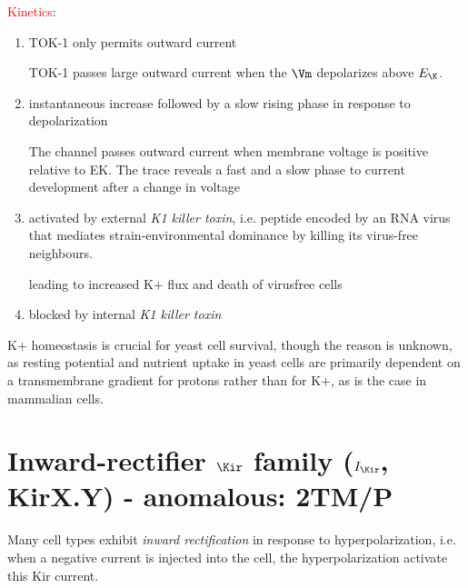 \textcolor{red}{Kinetics}:
\begin{enumerate}
  \item TOK-1  only permits outward current

TOK-1 passes large outward current when the $\Vm$ depolarizes above
$E_\K$.
  
  \item  instantaneous increase followed by a slow rising phase in response to
  depolarization 

The channel passes outward current when membrane voltage is positive relative to
EK. The trace reveals a fast and a slow phase to current development after a
change in voltage
 
  \item activated by external {\it K1 killer toxin}, i.e. peptide encoded by an
  RNA virus that mediates strain-environmental dominance by killing its
  virus-free neighbours.
  
  leading to increased K+ flux and death of virusfree cells

  \item blocked by internal {\it K1 killer toxin}  
\end{enumerate}

\begin{mdframed}

K+ homeostasis is crucial for yeast cell survival, though the reason is unknown, as resting potential and nutrient
uptake in yeast cells are primarily dependent on a transmembrane gradient for protons rather than for K+, as is 
the case in mammalian cells.

\end{mdframed}




  

\section{Inward-rectifier $\Kir$ family ($I_\Kir$, KirX.Y) - anomalous: 2TM/P}
\label{sec:Kir_family}

Many cell types exhibit {\it inward rectification} in response to
hyperpolarization, i.e. when a negative current is injected into the cell, the
hyperpolarization activate this Kir current.

